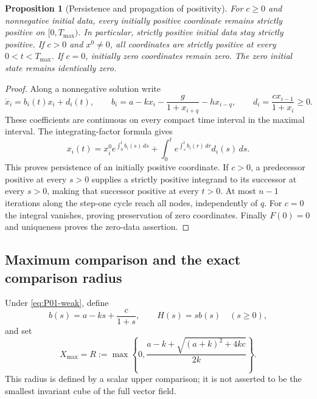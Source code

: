 \documentclass[11pt]{article}
\newtheorem{proposition}[theorem]{Proposition}
\theoremstyle{definition}
\theoremstyle{remark}
\begin{document}
\begin{proposition}[Persistence and propagation of positivity]
\label{prop:P01-positive}
For $c\ge0$ and nonnegative initial data, every initially positive
coordinate remains strictly positive on $[0,T_{\max})$. In particular,
strictly positive initial data stay strictly positive. If $c>0$ and
$x^0\ne0$, all coordinates are strictly positive at every
$0<t<T_{\max}$. If $c=0$, initially zero coordinates remain zero.
The zero initial state remains identically zero.
\end{proposition}
\begin{proof}
Along a nonnegative solution write
\[
 \dot x_i=b_i(t)x_i+d_i(t),\qquad
 b_i=a-kx_i-\frac{g}{1+x_{i+q}}-h x_{i-q},\qquad
 d_i=\frac{c x_{i-1}}{1+x_i}\ge0.
\]
These coefficients are continuous on every compact time interval in
the maximal interval. The integrating-factor formula gives
\begin{equation}
\label{eq:P01-positive}
 x_i(t)=x_i^0 e^{\int_0^t b_i(s)\,ds}
       +\int_0^t e^{\int_s^t b_i(r)\,dr}d_i(s)\,ds.
\end{equation}
This proves persistence of an initially positive coordinate.
If $c>0$, a predecessor positive at every $s>0$ supplies a strictly
positive integrand to its successor at every $s>0$, making that successor
positive at every $t>0$. At most $n-1$ iterations along the step-one
cycle reach all nodes, independently of $q$. For $c=0$ the integral
vanishes, proving preservation of zero coordinates. Finally $F(0)=0$
and uniqueness proves the zero-data assertion.
\end{proof}

\subsection{Maximum comparison and the exact comparison radius}
\label{slot:P01-2}
Under \eqref{eq:P01-weak}, define
\[
 b(s)=a-ks+\frac{c}{1+s},\qquad H(s)=s b(s)\quad(s\ge0),
\]
and set
\begin{equation}
\label{eq:P01-radius}
 X_{\max}=R:=\max\left\{0,\frac{a-k+\sqrt{(a+k)^2+4kc}}{2k}\right\}.
\end{equation}
This radius is defined by a scalar upper comparison; it is not asserted
to be the smallest invariant cube of the full vector field.
\end{document}
